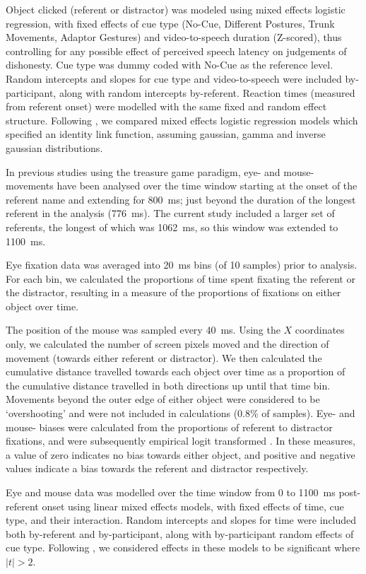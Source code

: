 \documentclass[a4paper,man,natbib]{apa6}
\begin{document}
Object clicked (referent or distractor) was modeled using mixed effects logistic regression, with fixed effects of cue type (No-Cue, Different Postures, Trunk Movements, Adaptor Gestures) and video-to-speech duration (Z-scored), thus controlling for any possible effect of perceived speech latency on judgements of dishonesty.
Cue type was dummy coded with No-Cue as the reference level.
Random intercepts and slopes for cue type and video-to-speech were included by-participant, along with random intercepts by-referent.
Reaction times (measured from referent onset) were modelled with the same fixed and random effect structure.
Following \citet{Lo2015}, we compared mixed effects logistic regression models which specified an identity link function, assuming gaussian, gamma and inverse gaussian distributions.

In previous studies using the treasure game paradigm, eye- and mouse- movements have been analysed over the time window starting at the onset of the referent name and extending for 800~ms; just beyond the duration of the longest referent in the analysis (776~ms). 
The current study included a larger set of referents, the longest of which was 1062~ms, so this window was extended to 1100~ms.

Eye fixation data was averaged into 20~ms bins (of 10 samples) prior to analysis.
For each bin, we calculated the proportions of time spent fixating the referent or the distractor, resulting in a measure of the proportions of fixations on either object over time.

The position of the mouse was sampled every 40~ms.
Using the $X$ coordinates only, we calculated the number of screen pixels moved and the direction of movement (towards either referent or distractor).
We then calculated the cumulative distance travelled towards each object over time as a proportion of the cumulative distance travelled in both directions up until that time bin.
Movements beyond the outer edge of either object were considered to be `overshooting' and were not included in calculations (0.8\% of samples).
Eye- and mouse- biases were calculated from the proportions of referent to distractor fixations, and were subsequently empirical logit transformed \citep{Barr2008}. 
In these measures, a value of zero indicates no bias towards either object, and positive and negative values indicate a bias towards the referent and distractor respectively.

Eye and mouse data was modelled over the time window from 0 to 1100~ms post-referent onset using linear mixed effects models, with fixed effects of time, cue type, and their interaction.
Random intercepts and slopes for time were included both by-referent and by-participant, along with by-participant random effects of cue type.
Following \citet{Baayen2008}, we considered effects in these models to be significant where $|t|>2$.
\end{document}
